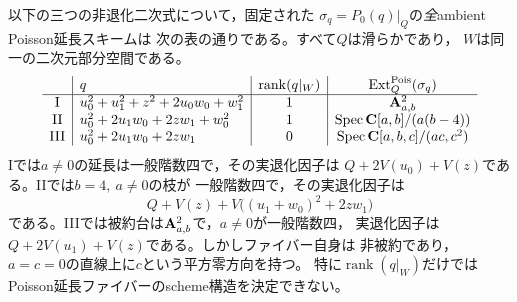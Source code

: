 \begin{theorem}[制限二次形式の退化に伴う三種類の延長ファイバー]
\label{thm:quadric-isotropic-log-fibres}
以下の三つの非退化二次式について，固定された
$\sigma_q=P_0(q)|_Q$の\emph{全}ambient Poisson延長スキームは
次の表の通りである。すべて$Q$は滑らかであり，
$W$は同一の二次元部分空間である。
\[
\begin{array}{c|l|c|c}
 &q&\operatorname{rank}(q|_W)&\ExtP_Q(\sigma_q)\\ \hline
 \mathrm{I}&u_0^2+u_1^2+z^2+2u_0w_0+w_1^2&1&\AA^2_{a,b}\\
 \mathrm{II}&u_0^2+2u_1w_0+2zw_1+w_0^2&1&
     \operatorname{Spec}\CC[a,b]/(a(b-4))\\
 \mathrm{III}&u_0^2+2u_1w_0+2zw_1&0&
     \operatorname{Spec}\CC[a,b,c]/(ac,c^2)
\end{array}
\]
Iでは$a\ne0$の延長は一般階数四で，その実退化因子は
$Q+2V(u_0)+V(z)$である。IIでは$b=4,\ a\ne0$の枝が
一般階数四で，その実退化因子は
\[
 Q+V(z)+V\bigl((u_1+w_0)^2+2zw_1\bigr)
\]
である。IIIでは被約台は$\AA^2_{a,b}$で，$a\ne0$が一般階数四，
実退化因子は$Q+2V(u_1)+V(z)$である。しかしファイバー自身は
非被約であり，$a=c=0$の直線上に$c$という平方零方向を持つ。
特に$\operatorname{rank}(q|_W)$だけでは
Poisson延長ファイバーのscheme構造を決定できない。
\end{theorem}
